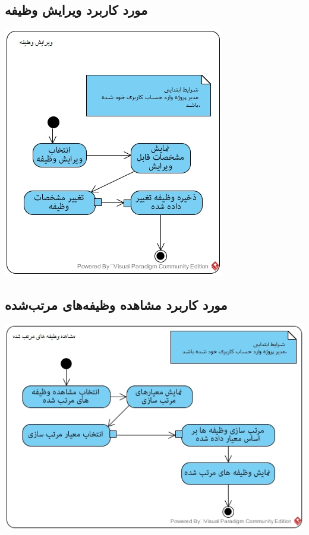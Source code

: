 \subsection*{مورد کاربرد ویرایش وظیفه}
\vspace{2cm}
\begin{center}
\includegraphics[width=\textwidth]{ActivityDiagrams/19.jpg}
\end{center}

\newpage
\vspace{2cm}
\subsection*{مورد کاربرد مشاهده وظیفه‌های مرتب‌شده}
\vspace{2cm}
\begin{center}
\includegraphics[width=\textwidth]{ActivityDiagrams/20.jpg}
\end{center}

